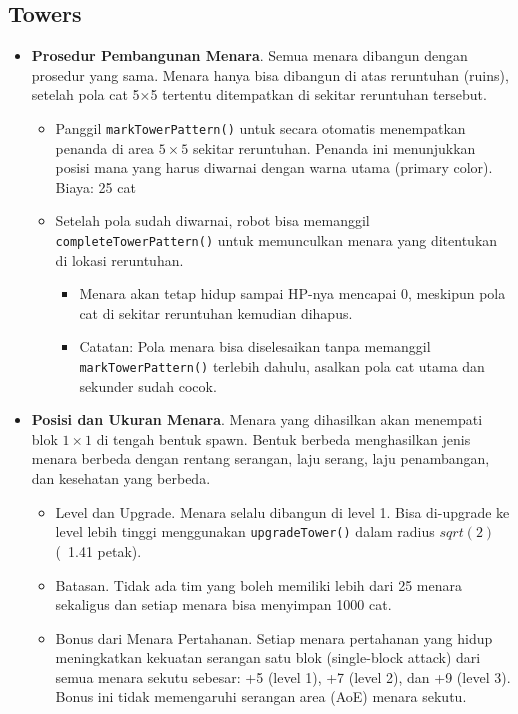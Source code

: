 \subsection{Towers}
\begin{itemize}
    \item \textbf{Prosedur Pembangunan Menara}. Semua menara dibangun dengan prosedur yang sama. Menara hanya bisa dibangun di atas reruntuhan (ruins), setelah pola cat 5×5 tertentu ditempatkan di sekitar reruntuhan tersebut.
          \begin{itemize}
              \item Panggil \texttt{markTowerPattern()} untuk secara otomatis menempatkan penanda di area $5 \times 5$ sekitar reruntuhan. Penanda ini menunjukkan posisi mana yang harus diwarnai dengan warna utama (primary color). Biaya: 25 cat
              \item Setelah pola sudah diwarnai, robot bisa memanggil \texttt{completeTowerPattern()} untuk memunculkan menara yang ditentukan di lokasi reruntuhan.
                    \begin{itemize}
                        \item Menara akan tetap hidup sampai HP-nya mencapai 0, meskipun pola cat di sekitar reruntuhan kemudian dihapus.
                        \item Catatan: Pola menara bisa diselesaikan tanpa memanggil \texttt{markTowerPattern()} terlebih dahulu, asalkan pola cat utama dan sekunder sudah cocok.
                    \end{itemize}
          \end{itemize}
    \item \textbf{Posisi dan Ukuran Menara}. Menara yang dihasilkan akan menempati blok $1 \times 1$ di tengah bentuk spawn. Bentuk berbeda menghasilkan jenis menara berbeda dengan rentang serangan, laju serang, laju penambangan, dan kesehatan yang berbeda.
          \begin{itemize}
              \item Level dan Upgrade. Menara selalu dibangun di level 1. Bisa di-upgrade ke level lebih tinggi menggunakan \texttt{upgradeTower()} dalam radius $sqrt(2)$ (~1.41 petak).
              \item Batasan. Tidak ada tim yang boleh memiliki lebih dari 25 menara sekaligus dan setiap menara bisa menyimpan 1000 cat.
              \item Bonus dari Menara Pertahanan. Setiap menara pertahanan yang hidup meningkatkan kekuatan serangan satu blok (single-block attack) dari semua menara sekutu sebesar: +5 (level 1), +7 (level 2), dan +9 (level 3). Bonus ini tidak memengaruhi serangan area (AoE) menara sekutu.
          \end{itemize}
\end{itemize}

